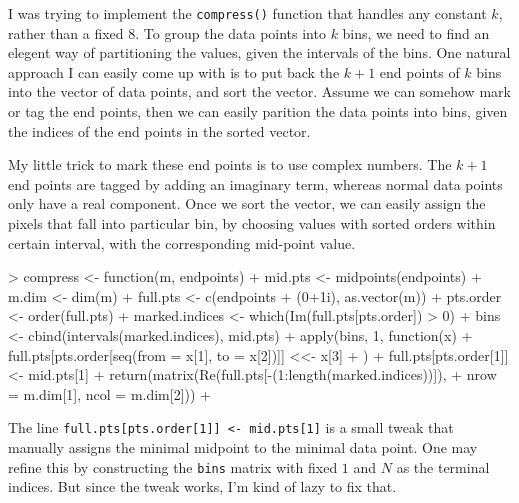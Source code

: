 \begin{enumerate}[(a)]
    I was trying to implement the \verb=compress()= function that handles any constant $k$, rather than a fixed $8$. 
    To group the data points into $k$ bins, we need to find an elegent way of partitioning the values, given the intervals of the bins.
    One natural approach I can easily come up with is to put back the $k+1$ end points of $k$ bins into the vector of data points, and sort the vector. Assume we can somehow mark or tag the end points, then we can easily parition the data points into bins, given the indices of the end points in the sorted vector. 

    My little trick to mark these end points is to use complex numbers. The $k+1$ end points are tagged by adding an imaginary term, whereas normal data points only have a real component.
    Once we sort the vector, we can easily assign the pixels that fall into particular bin, by choosing values with sorted orders within certain interval, with the corresponding mid-point value. 
\begin{Schunk}
\begin{Sinput}
> compress <- function(m, endpoints) {
+     mid.pts <- midpoints(endpoints)
+     m.dim <- dim(m)
+     full.pts <- c(endpoints + (0+1i), as.vector(m))
+     pts.order <- order(full.pts)
+     marked.indices <- which(Im(full.pts[pts.order]) > 0)
+     bins <- cbind(intervals(marked.indices), mid.pts)
+     apply(bins, 1, function(x) {
+         full.pts[pts.order[seq(from = x[1], to = x[2])]] <<- x[3]
+     })
+     full.pts[pts.order[1]] <- mid.pts[1]
+     return(matrix(Re(full.pts[-(1:length(marked.indices))]), 
+         nrow = m.dim[1], ncol = m.dim[2]))
+ }
\end{Sinput}
\end{Schunk}
    The line \verb=full.pts[pts.order[1]] <- mid.pts[1]= is a small tweak that manually assigns the minimal midpoint to the minimal data point. One may refine this by constructing the \verb=bins= matrix with fixed $1$ and $N$ as the terminal indices. But since the tweak works, I'm kind of lazy to fix that.
    

\end{enumerate}
